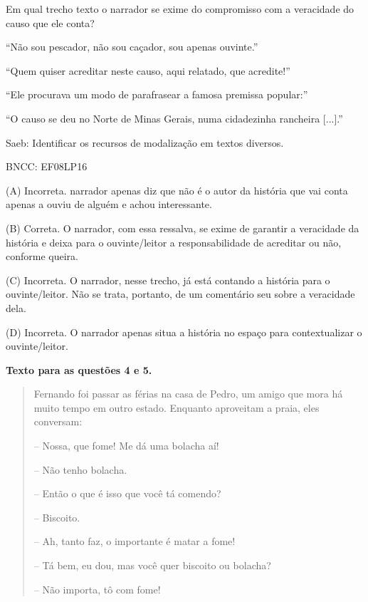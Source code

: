 
Em qual trecho texto o narrador se exime do compromisso com a veracidade
do causo que ele conta?

\begin{escolha}
\item ``Não sou pescador, não sou caçador, sou apenas ouvinte.''

\item ``Quem quiser acreditar neste causo, aqui relatado, que acredite!''

\item ``Ele procurava um modo de parafrasear a famosa premissa popular:''

\item ``O causo se deu no Norte de Minas Gerais, numa cidadezinha rancheira
{[}...{]}.''
\end{escolha}

Saeb: Identificar os recursos de modalização em textos diversos.

BNCC: EF08LP16

(A) Incorreta. narrador apenas diz que não é o autor da história que
vai conta apenas a ouviu de alguém e achou interessante.

(B) Correta. O narrador, com essa ressalva, se exime de
garantir a
veracidade da história e deixa para o ouvinte/leitor a responsabilidade
de acreditar ou não, conforme queira.

(C) Incorreta. O narrador, nesse trecho, já está contando a história
para o ouvinte/leitor. Não se trata, portanto, de um comentário seu
sobre a veracidade dela.

(D) Incorreta. O narrador apenas situa a história no espaço para
contextualizar o ouvinte/leitor.

\textbf{Texto para as questões 4 e 5.}

\begin{quote}
Fernando foi passar as férias na casa de Pedro, um amigo que mora há
muito tempo em outro
estado. Enquanto aproveitam a praia, eles conversam:

-- Nossa, que fome! Me dá uma bolacha aí!

-- Não tenho bolacha.

-- Então o que é isso que você tá comendo?

-- Biscoito.

-- Ah, tanto faz, o importante é matar a fome!

-- Tá bem, eu dou, mas você quer biscoito ou bolacha?

-- Não importa, tô com fome!
\end{quote}


